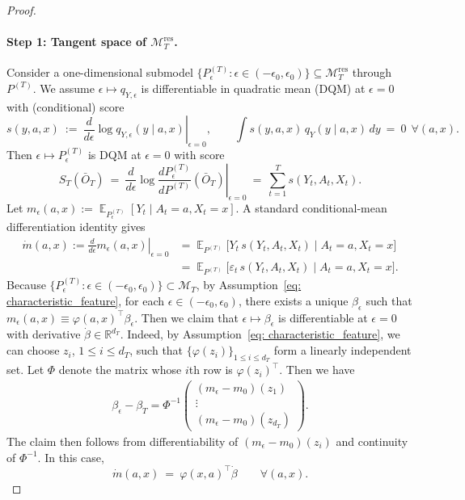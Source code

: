 \documentclass[11pt]{article}
\DeclareMathOperator{\E}{\mathbb{E}}
\begin{document}
\begin{proof}
\paragraph{Step 1: Tangent space of $\mathcal{M}_T^{\mathrm{res}}$. }
Consider a one-dimensional submodel
$\{P^{(T)}_\epsilon:\epsilon\in(-\epsilon_0,\epsilon_0)\} \subseteq \mathcal{M}^{\mathrm{res}}_T$ through $P^{(T)}$. We assume $\epsilon \mapsto q_{Y,\epsilon}$ is differentiable in quadratic mean (DQM) at $\epsilon = 0$ with (conditional) score 
\[
s(y,a,x)\ :=\ \left.\frac{d}{d\epsilon}\log q_{Y,\epsilon}(y\mid a,x)\right|_{\epsilon=0},
\qquad
\int s(y,a,x)\,q_Y(y\mid a,x)\,dy\ =\ 0\ \ \forall (a,x).
\]
Then $\epsilon \mapsto P_{\epsilon}^{(T)}$ is DQM at $\epsilon = 0$ with score
\[
S_T(\bar O_T)\ =\ \left.\frac{d}{d\epsilon}\log \frac{dP^{(T)}_\epsilon}{dP^{(T)}}(\bar O_T)\right|_{\epsilon=0}
\ =\ \sum_{t=1}^T s(Y_t,A_t,X_t).
\]
Let $m_\epsilon(a,x):=\E_{P^{(T)}_\epsilon}[Y_t\mid A_t=a,X_t=x]$. A standard conditional-mean differentiation identity gives
\begin{align}
    \dot{m}(a,x) := \left.\frac{d}{d\epsilon}m_\epsilon(a,x)\right|_{\epsilon=0} &= \E_{P^{(T)}}\!\big[Y_t\,s(Y_t,A_t,X_t)\mid A_t=a,X_t=x\big]\nonumber\\
    &= \E_{P^{(T)}}\!\big[\varepsilon_t\,s(Y_t,A_t,X_t)\mid A_t=a,X_t=x\big].\label{eq:dotm_identity} 
\end{align}
Because $\{P_{\epsilon}^{(T)}: \epsilon \in (-\epsilon_0, \epsilon_0)\} \subset \mathcal{M}_T$, by Assumption~\ref{eq: characteristic_feature}, for each $\epsilon\in (-\epsilon_0, \epsilon_0)$, there exists a unique $\beta_{\epsilon}$ such that $m_{\epsilon}(a,x)\equiv \varphi(a,x)^{\top}\beta_{\epsilon}$. Then we claim that $\epsilon \mapsto \beta_{\epsilon}$ is differentiable at $\epsilon = 0$ with derivative $\dot{\beta}\in \mathbb{R}^{d_T}$. 
Indeed, by Assumption~\ref{eq: characteristic_feature}, we can choose $z_i$, $1\leq i\leq d_T$, such that $\{\varphi(z_i)\}_{1\leq i\leq d_T}$ form a linearly independent set. Let $\Phi$ denote the matrix whose $i$th row is $\varphi(z_i)^{\top}$. Then we have 
\begin{align*}
    \beta_{\epsilon} - \beta_T = \Phi^{-1}\begin{pmatrix}
        (m_{\epsilon} - m_0)(z_1)\\
        \vdots\\
        (m_{\epsilon} - m_0)(z_{d_T})
    \end{pmatrix}.
\end{align*}
The claim then follows from differentiability of $(m_{\epsilon} - m_0)(z_i)$ and continuity of $\Phi^{-1}$. In this case, 
\begin{equation}
\label{eq:dotm_linear}
\dot m(a,x)\ =\ \varphi(x,a)^\top \dot\beta
\qquad\forall(a,x).
\end{equation}



\end{proof}
\end{document}
